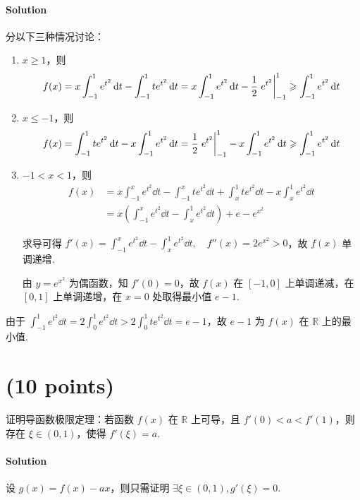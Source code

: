 \documentclass{ctexart}
\begin{document}
\paragraph{Solution}
    分以下三种情况讨论：
    \begin{enumerate}
        \item $x \geqslant 1$，则
        \[
            f(x) = x\int_{-1}^1 e^{t^2} \dd{t} - \int_{-1}^1 te^{t^2} \dd{t}
                            = x\int_{-1}^1 e^{t^2} \dd{t} - \frac{1}{2} \eval{e^{t^2}}_{-1}^1
                            \geqslant \int_{-1}^1 e^{t^2} \dd{t}
        \]
        \item $x \leqslant -1$，则
        \[
            f(x) = \int_{-1}^1 te^{t^2} \dd{t} - x\int_{-1}^1 e^{t^2} \dd{t}
                            = \frac{1}{2} \eval{e^{t^2}}_{-1}^1 - x\int_{-1}^1 e^{t^2} \dd{t}
                            \geqslant \int_{-1}^1 e^{t^2} \dd{t}
        \]
        \item $-1<x<1$，则
        \begin{align*}
            f(x) &= x\int_{-1}^x e^{t^2} \dd{t} - \int_{-1}^x te^{t^2} \dd{t} + \int_x^1 te^{t^2} \dd{t} - x\int_x^1 e^{t^2} \dd{t} \\
                    &= x \left(\int_{-1}^x e^{t^2}\dd{t} - \int_x^1 e^{t^2}\dd{t} \right) + e - e^{x^2}
        \end{align*}

        求导可得 $f'(x) = \displaystyle\int_{-1}^x e^{t^2}\dd{t} - \int_x^1 e^{t^2}\dd{t},\quad f''(x)=2e^{x^2}>0$，故 $f(x)$ 单调递增.

        由 $y=e^{x^2}$ 为偶函数，知 $f'(0)=0$，故 $f(x)$ 在 $[-1,0]$ 上单调递减，在 $[0,1]$ 上单调递增，在 $x=0$ 处取得最小值 $e-1$.
    \end{enumerate}

    由于 $\displaystyle\int_{-1}^1 e^{t^2} \dd{t} = 2\int_0^1 e^{t^2} \dd{t} > 2\int_0^1 te^{t^2} \dd{t} = e-1$，故 $e-1$ 为 $f(x)$ 在 $\mathbb{R}$ 上的最小值.

\section{(10 points)}
    证明导函数极限定理：若函数 $f(x)$ 在 $\mathbb{R}$ 上可导，且 $f'(0)<a<f'(1)$，则存在 $\xi \in (0,1)$，使得 $f'(\xi)=a$.
\paragraph{Solution}
    设 $g(x)=f(x)-ax$，则只需证明 $\exists \xi \in (0,1), g'(\xi)=0$.
\end{document}
